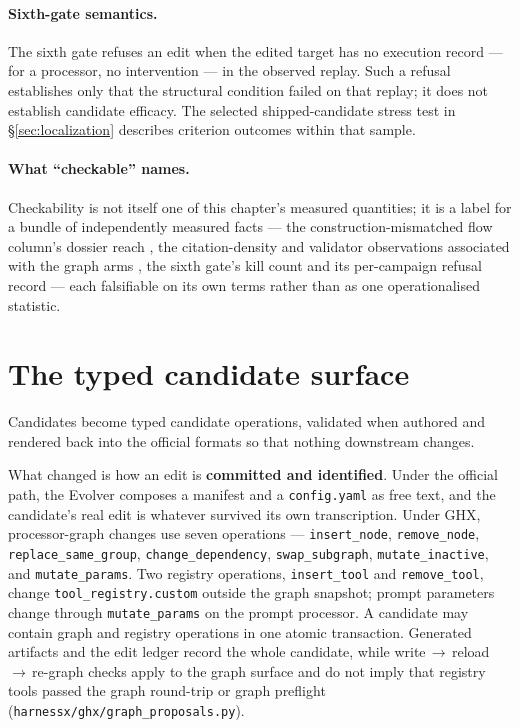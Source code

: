 \paragraph{Sixth-gate semantics.} The sixth gate refuses an edit when
the edited target has no execution record --- for a processor, no
intervention --- in the observed replay. Such a refusal establishes only
that the structural condition failed on that replay; it does not establish
candidate efficacy. The selected shipped-candidate stress test in
\S\ref{sec:localization} describes criterion outcomes within that sample.

\paragraph{What ``checkable'' names.} Checkability is not itself one of
this chapter's measured quantities; it is a label for a bundle of
independently measured facts --- the construction-mismatched flow column's dossier reach
, the citation-density and validator observations associated with the
graph arms , the sixth gate's kill count  and its per-campaign
refusal record
 --- each falsifiable on its own terms rather than as one
operationalised statistic.

\section{The typed candidate surface}
\label{sec:candidate-surface}

Candidates become typed candidate operations, validated when authored and
rendered back into the official formats so that nothing downstream changes.

What changed is how an edit is \textbf{committed and identified}. Under the
official path, the Evolver composes a manifest and a \texttt{config.yaml}
as free text, and the candidate's real edit is whatever survived its own
transcription. Under GHX, processor-graph changes use seven operations ---
\texttt{insert\_node}, \texttt{remove\_node},
\texttt{replace\_same\_group}, \texttt{change\_dependency},
\texttt{swap\_subgraph}, \texttt{mutate\_inactive}, and
\texttt{mutate\_params}. Two registry operations, \texttt{insert\_tool}
and \texttt{remove\_tool}, change \texttt{tool\_registry.custom} outside
the graph snapshot; prompt parameters change through
\texttt{mutate\_params} on the prompt processor. A candidate may contain
graph and registry operations in one atomic transaction. Generated
artifacts and the edit ledger record the whole candidate, while
write\,$\to$\,reload\,$\to$\,re-graph checks apply to the graph surface
and do not imply that registry tools passed the graph round-trip or graph
preflight (\texttt{harnessx/ghx/graph\_proposals.py}).

